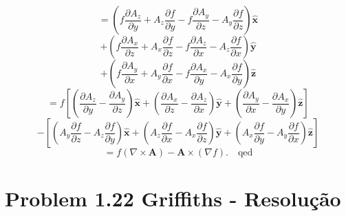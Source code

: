 \documentclass[a4paper,12pt]{article}
\begin{document}
\begin{itemize}
    \begin{equation}
    = \left( f \frac{\partial A_z}{\partial y} + A_z \frac{\partial f}{\partial y} - f \frac{\partial A_y}{\partial z} - A_y \frac{\partial f}{\partial z} \right) \hat{\mathbf{x}} 
    \end{equation}
    \begin{equation}
    + \left( f \frac{\partial A_x}{\partial z} + A_x \frac{\partial f}{\partial z} - f \frac{\partial A_z}{\partial x} - A_z \frac{\partial f}{\partial x} \right) \hat{\mathbf{y}}
    \end{equation}
    \begin{equation}
    + \left( f \frac{\partial A_y}{\partial x} + A_y \frac{\partial f}{\partial x} - f \frac{\partial A_x}{\partial y} - A_x \frac{\partial f}{\partial y} \right) \hat{\mathbf{z}}
    \end{equation}
    \begin{equation}
    = f \left[ \left( \frac{\partial A_z}{\partial y} - \frac{\partial A_y}{\partial z} \right) \hat{\mathbf{x}} 
    + \left( \frac{\partial A_x}{\partial z} - \frac{\partial A_z}{\partial x} \right) \hat{\mathbf{y}} 
    + \left( \frac{\partial A_y}{\partial x} - \frac{\partial A_x}{\partial y} \right) \hat{\mathbf{z}} \right]
    \end{equation}
    \begin{equation}
    - \left[ \left( A_y \frac{\partial f}{\partial z} - A_z \frac{\partial f}{\partial y} \right) \hat{\mathbf{x}} 
    + \left( A_z \frac{\partial f}{\partial x} - A_x \frac{\partial f}{\partial z} \right) \hat{\mathbf{y}} 
    + \left( A_x \frac{\partial f}{\partial y} - A_y \frac{\partial f}{\partial x} \right) \hat{\mathbf{z}} \right]
    \end{equation}
    \begin{equation}
    = f (\nabla \times \mathbf{A}) - \mathbf{A} \times (\nabla f). \quad \text{qed}
    \end{equation}

\end{itemize}

\section*{Problem 1.22 Griffiths - Resolu\c{c}\~ao}
\end{document}
